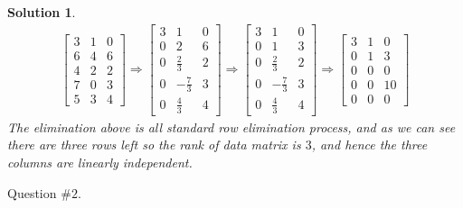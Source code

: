 \documentclass[11pt]{article}
\newtheorem{sol}{Solution}
\begin{document}
\begin{sol}
\begin{align*}
		\left[\begin{array}{ccc} 3&1&0 \\ 6&4&6\\ 4&2&2\\ 7&0&3\\ 5&3&4\end{array}\right] \Longrightarrow \left[\begin{array}{ccc} 3&1& 0\\ 0&2&6\\ 0&\frac{2}{3}&2\\ 0&-\frac{7}{3}&3\\ 0&\frac{4}{3}&4\end{array}\right] \Longrightarrow \left[\begin{array}{ccc} 3&1&0 \\ 0&1&3\\ 0&\frac{2}{3}&2\\ 0&-\frac{7}{3}&3\\ 0&\frac{4}{3}&4\end{array}\right]\Longrightarrow \left[\begin{array}{ccc} 3&1&0 \\ 0&1&3\\ 0&0&0\\ 0&0&10\\ 0&0&0\end{array}\right]
	\end{align*}
	The elimination above is all standard row elimination process, and as we can see there are three rows left so the rank of data matrix is $3$, and hence the three columns are linearly independent.
\end{sol}
\vskip 2mm
Question $\# 2$.
\end{document}
